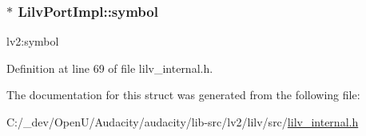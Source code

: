 \subsubsection[{\texorpdfstring{symbol}{symbol}}]{$\ast$ Lilv\+Port\+Impl\+::symbol}\hypertarget{struct_lilv_port_impl_a5c5c752bd0daa332344f246dab05065c}{}\label{struct_lilv_port_impl_a5c5c752bd0daa332344f246dab05065c}


lv2\+:symbol 



Definition at line 69 of file lilv\+\_\+internal.\+h.



The documentation for this struct was generated from the following file\+:\begin{DoxyCompactItemize}
\item 
C\+:/\+\_\+dev/\+Open\+U/\+Audacity/audacity/lib-\/src/lv2/lilv/src/\hyperlink{lilv__internal_8h}{lilv\+\_\+internal.\+h}\end{DoxyCompactItemize}
